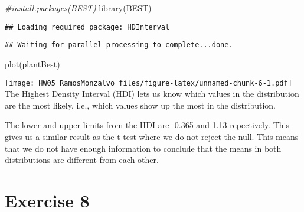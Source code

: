 \documentclass[
]{article}
\newenvironment{Shaded}{\begin{snugshade}}{\end{snugshade}}
\newcommand{\CommentTok}[1]{\textcolor[rgb]{0.56,0.35,0.01}{\textit{#1}}}
\newcommand{\FunctionTok}[1]{\textcolor[rgb]{0.00,0.00,0.00}{#1}}
\newcommand{\NormalTok}[1]{#1}
\newcommand{\OtherTok}[1]{\textcolor[rgb]{0.56,0.35,0.01}{#1}}
\newcommand{\SpecialCharTok}[1]{\textcolor[rgb]{0.00,0.00,0.00}{#1}}
\newcommand{\StringTok}[1]{\textcolor[rgb]{0.31,0.60,0.02}{#1}}
\begin{document}
\begin{Shaded}
\begin{Highlighting}[]
\CommentTok{\#install.packages(\textquotesingle{}BEST\textquotesingle{})}
\FunctionTok{library}\NormalTok{(}\StringTok{\textquotesingle{}BEST\textquotesingle{}}\NormalTok{)}
\end{Highlighting}
\end{Shaded}

\begin{verbatim}
## Loading required package: HDInterval
\end{verbatim}

\begin{Shaded}
\end{Shaded}

\begin{verbatim}
## Waiting for parallel processing to complete...done.
\end{verbatim}

\begin{Shaded}
\begin{Highlighting}[]
\FunctionTok{plot}\NormalTok{(plantBest)}
\end{Highlighting}
\end{Shaded}

\texttt{[image: HW05\_RamosMonzalvo\_files/figure-latex/unnamed-chunk-6-1.pdf]}
The Highest Density Interval (HDI) lets us know which values in the
distribution are the most likely, i.e., which values show up the most in
the distribution.

The lower and upper limits from the HDI are -0.365 and 1.13 repectively.
This gives us a similar result as the t-test where we do not reject the
null. This means that we do not have enough information to conclude that
the means in both distributions are different from each other.

\hypertarget{exercise-8}{%
\section{Exercise 8}\label{exercise-8}}
\end{document}
